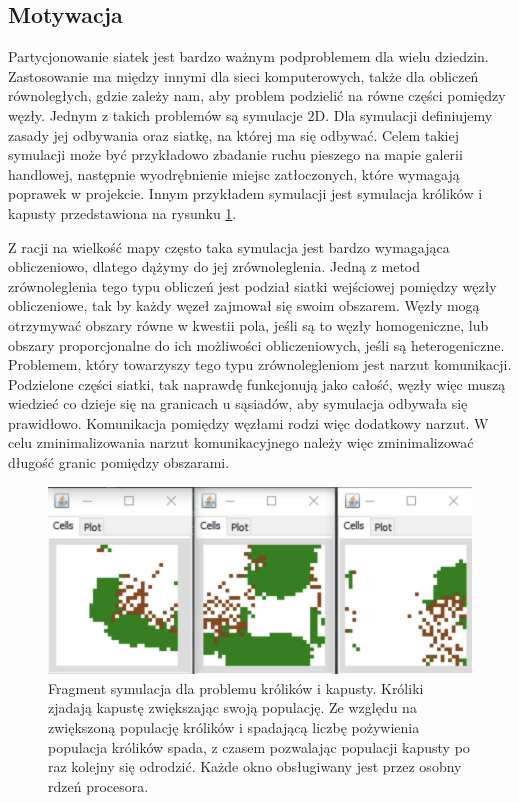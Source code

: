 \subsection{Motywacja}
Partycjonowanie siatek jest bardzo ważnym podproblemem dla wielu dziedzin.
Zastosowanie ma między innymi dla sieci komputerowych, także dla obliczeń równoległych, gdzie zależy nam,
aby problem podzielić na równe części pomiędzy węzły.
Jednym z takich problemów są symulacje $2$D.
Dla symulacji definiujemy zasady jej odbywania oraz siatkę, na której ma się odbywać.
Celem takiej symulacji może być przykładowo zbadanie ruchu pieszego na mapie galerii handlowej, następnie wyodrębnienie miejsc
zatłoczonych, które wymagają poprawek w projekcie.
Innym przykładem symulacji jest symulacja królików i kapusty przedstawiona na rysunku \ref{im:kroliki}.

Z racji na wielkość mapy często taka symulacja jest bardzo wymagająca obliczeniowo, dlatego dążymy do jej
zrównoleglenia.
Jedną z metod zrównoleglenia tego typu obliczeń jest podział siatki wejściowej pomiędzy węzły obliczeniowe,
tak by każdy węzeł zajmował się swoim obszarem.
Węzły mogą otrzymywać obszary równe w kwestii pola, jeśli są to węzły homogeniczne, lub obszary proporcjonalne do ich
możliwości obliczeniowych, jeśli są heterogeniczne.
Problemem, który towarzyszy tego typu zrównolegleniom jest narzut komunikacji.
Podzielone części siatki, tak naprawdę funkcjonują jako całość, węzły więc muszą wiedzieć co dzieje się na granicach u sąsiadów,
aby symulacja odbywała się prawidłowo.
Komunikacja pomiędzy węzłami rodzi więc dodatkowy narzut.
W celu zminimalizowania narzut komunikacyjnego należy więc zminimalizować długość granic pomiędzy obszarami.

\begin{figure}[h]
    \centering
    \includegraphics[width=0.6\linewidth]{images/kroliki}
    \caption{Fragment symulacja dla problemu królików i kapusty. Króliki zjadają kapustę zwiększając swoją populację. Ze względu
    na zwiększoną populację królików i spadającą liczbę pożywienia populacja królików spada, z czasem pozwalając
    populacji kapusty po raz kolejny się odrodzić. Każde okno obsługiwany jest przez osobny rdzeń procesora.}
    \label{im:kroliki}
\end{figure}

